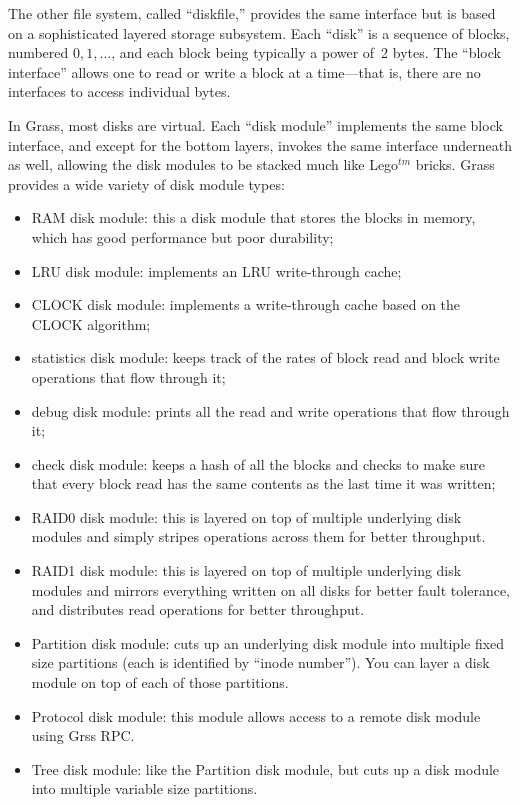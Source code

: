 \documentclass{article}
\begin{document}
The other file system, called ``diskfile,'' provides the same interface
but is based on a sophisticated layered storage subsystem.
Each ``disk'' is a sequence of blocks, numbered $0, 1, ...$, and each
block being typically a power of~2 bytes.
The ``block interface'' allows one to read or write a block
at a time---that is, there are no interfaces to access individual bytes.

In Grass, most disks are virtual.
Each ``disk module'' implements the same block interface, and except for
the bottom layers, invokes the same interface underneath as well, allowing
the disk modules to be stacked much like Lego$^{tm}$ bricks.
Grass provides a wide variety of disk module types:

\begin{itemize}
\item RAM disk module: this a disk module that stores the blocks in memory,
which has good performance but poor durability;
\item LRU disk module: implements an LRU write-through cache;
\item CLOCK disk module: implements a write-through cache based on the CLOCK algorithm;
\item statistics disk module: keeps track of the rates of block read and block write operations that flow through it;
\item debug disk module: prints all the read and write operations that flow through it;
\item check disk module: keeps a hash of all the blocks and checks to make sure that every block read has the same contents as the last time it was written;
\item RAID0 disk module: this is layered on top of multiple underlying disk modules and simply stripes operations across them for better throughput.
\item RAID1 disk module: this is layered on top of multiple underlying disk modules and mirrors everything written on all disks for better fault tolerance, and distributes read operations for better throughput.
\item Partition disk module: cuts up an underlying disk module into multiple fixed size partitions (each is identified by ``inode number'').  You can layer a disk module on top of each of those partitions.
\item Protocol disk module: this module allows access to a remote disk module using Grss RPC.
\item Tree disk module: like the Partition disk module, but cuts up a disk module into multiple variable size partitions.
\end{itemize}
\end{document}
